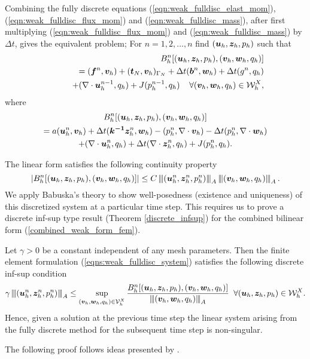 Combining the fully discrete equations (\ref{eqn:weak_fulldisc_elast_mom}), (\ref{eqn:weak_fulldisc_flux_mom}) and (\ref{eqn:weak_fulldisc_mass}), after first multiplying (\ref{eqn:weak_fulldisc_flux_mom}) and (\ref{eqn:weak_fulldisc_mass}) by $\Delta t$, gives the equivalent problem; For $n = 1,2,\ldots, n$ find $(\boldsymbol{u}_{h},\boldsymbol{z}_{h},p_h)$ such that
\begin{eqnarray*}
\label{Btimestep_weakform}
&&B_{h}^{n}[(\boldsymbol{u}_{h},\boldsymbol{z}_{h},p_h),(\boldsymbol{v}_{h},\boldsymbol{w}_{h},{q}_{h})] \nonumber \\
&& \quad = (\boldsymbol{f}^{n},\boldsymbol{v}_{h}) + (\boldsymbol{t}_{N},\boldsymbol{v}_{h})_{\Gamma_{N}}
          + \Delta t(\boldsymbol{b}^{n},\boldsymbol{w}_{h})
          +\Delta t(g^{n},{q}_{h}) \nonumber \\
&& \qquad + (\nabla \cdot \boldsymbol{u}_{h}^{n-1} ,{q}_{h})
          + J(p_h^{n-1},{q}_{h})\;\;\;\; \forall (\boldsymbol{v}_{h},\boldsymbol{w}_{h},{q}_{h}) \in \mathcal{W}^{X}_{h},
\end{eqnarray*}
where
\begin{multline}
B_{h}^{n}[(\boldsymbol{u}_{h},\boldsymbol{z}_{h},p_h),(\boldsymbol{v}_{h},\boldsymbol{w}_{h},{q}_{h})] \\
=a(\boldsymbol{u}_{h}^{n},\boldsymbol{v}_{h})+ \Delta t(\boldsymbol{k^{-1}} \boldsymbol{z}_{h}^{n}, \boldsymbol{w}_{h}) - (p_h^{n}, \nabla \cdot \boldsymbol{v}_{h})  - \Delta t (p_h^{n}, \nabla \cdot \boldsymbol{w}_{h}) \\ + (\nabla \cdot \boldsymbol{u}_{h}^{n},{q}_{h})  + \Delta t ( \nabla \cdot \boldsymbol{z}_{h}^{n},{q}_{h}) + J(p_h^{n},{q}_{h}).
\label{combined_weak_form_fem}
\end{multline}

The linear form  satisfies the following continuity property
\begin{equation*}
|B_{h}^{n}[(\boldsymbol{u}_{h},\boldsymbol{z}_{h},p_h),(\boldsymbol{v}_{h},\boldsymbol{w}_{h},{q}_{h})] | \leq C \left\vert\kern-0.25ex\left\vert\kern-0.25ex\left\vert (\boldsymbol{u}_{h}^{n},\boldsymbol{z}_{h}^{n},p_h^{n}) \right\vert\kern-0.25ex\right\vert\kern-0.25ex\right\vert_{A} \left\vert\kern-0.25ex\left\vert\kern-0.25ex\left\vert (\boldsymbol{v}_{h},\boldsymbol{w}_{h},{q}_{h}) \right\vert\kern-0.25ex\right\vert\kern-0.25ex\right\vert_{A}.
\end{equation*}
We apply Babuska's theory \cite{babuvska1971error} to show well-posedness (existence and uniqueness) of this discretized system at a particular time step. This requires us to prove a discrete inf-sup type result (Theorem \ref{discrete_infsup}) for the combined bilinear form (\ref{combined_weak_form_fem}).
\begin{theorem}
\label{discrete_infsup}
Let $\gamma>0$ be a constant independent of any mesh parameters. Then the finite element formulation (\ref{eqns:weak_fulldisc_system}) satisfies the following discrete inf-sup condition
\begin{equation}
  \gamma \left\vert\kern-0.25ex\left\vert\kern-0.25ex\left\vert (\boldsymbol{u}_{h}^{n},\boldsymbol{z}_{h}^{n},p_h^{n}) \right\vert\kern-0.25ex\right\vert\kern-0.25ex\right\vert_{A} \leq \sup_{(\boldsymbol{v}_{h},\boldsymbol{w}_{h},{q}_{h}) \in \mathcal{V}^{X}_{h}}\frac{B_{h}^{n}[(\boldsymbol{u}_{h},\boldsymbol{z}_{h},p_h),(\boldsymbol{v}_{h},\boldsymbol{w}_{h},{q}_{h})]}{\left\vert\kern-0.25ex\left\vert\kern-0.25ex\left\vert (\boldsymbol{v}_{h},\boldsymbol{w}_{h},{q}_{h}) \right\vert\kern-0.25ex\right\vert\kern-0.25ex\right\vert_{A}} \;\; \forall (\boldsymbol{u}_{h},\boldsymbol{z}_{h},p_h) \in \mathcal{W}^{X}_{h}.
\end{equation}
Hence, given a solution at the previous time step the linear system arising from the fully discrete method for the subsequent time step is non-singular.
\end{theorem}
\noindent The following proof follows ideas presented by \cite{burman2007unified}.\newline

